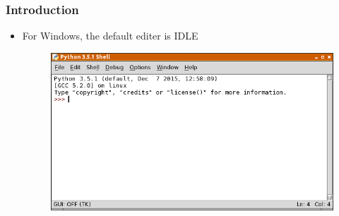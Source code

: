 
\begin{frame}
\frametitle{Introduction}

\begin{itemize}
\item For Windows, the default editer is IDLE
\begin{figure}
\includegraphics[width=0.8\linewidth]{idlex_main.png}
\end{figure}
\end{itemize}

\end{frame}
